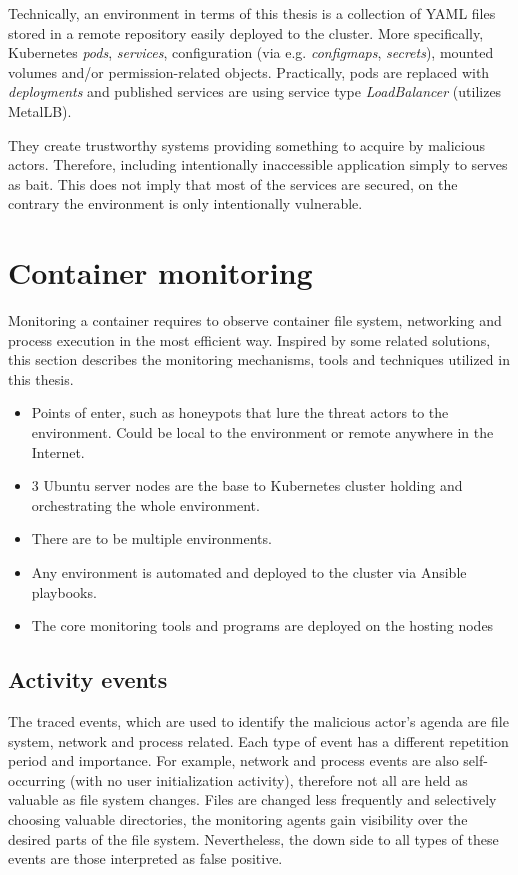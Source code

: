 Technically, an environment in terms of this thesis is a collection of YAML files stored in a remote repository easily deployed to the cluster. More specifically, Kubernetes \textit{pods}, \textit{services}, configuration (via e.g. \textit{configmaps}, \textit{secrets}), mounted volumes and/or permission-related objects. Practically, pods are replaced with \textit{deployments} and published services are using service type \textit{LoadBalancer} (utilizes MetalLB).

They create trustworthy systems providing something to acquire by malicious actors. Therefore, including intentionally inaccessible application simply to serves as bait. This does not imply that most of the services are secured, on the contrary the environment is only intentionally vulnerable.

\section{Container monitoring \label{design:con-mon}}
Monitoring a container requires to observe container file system, networking and process execution in the most efficient way. Inspired by some related solutions, this section describes the monitoring mechanisms, tools and techniques utilized in this thesis.

\begin{itemize}[noitemsep]
	\item 
	Points of enter, such as honeypots that lure the threat actors to the environment. Could be local to the environment or remote anywhere in the Internet.
	\item 
	3 Ubuntu server nodes are the base to Kubernetes cluster holding and orchestrating the whole environment.
	\item 
	There are to be multiple environments.
	\item
	Any environment is automated and deployed to the cluster via Ansible playbooks.
	\item 
	The core monitoring tools and programs are deployed on the hosting nodes
\end{itemize}

\subsection{Activity events \label{design:mon:events}}
The traced events, which are used to identify the malicious actor's agenda are file system, network and process related. Each type of event has a different repetition period and importance. For example, network and process events are also self-occurring (with no user initialization activity), therefore not all are held as valuable as file system changes. Files are changed less frequently and selectively choosing valuable directories, the monitoring agents gain visibility over the desired parts of the file system. Nevertheless, the down side to all types of these events are those interpreted as false positive.

